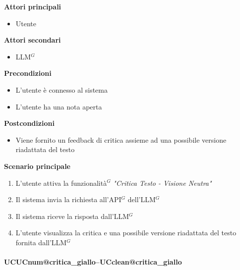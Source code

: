 \documentclass[a4paper,10pt]{article}
\makeatletter
\def\UCText#1{UC\csname UCnum@#1\endcsname\space--\space\csname UCclean@#1\endcsname}%
\makeatother
\begin{document}
    \textbf{Attori principali}
    \begin{itemize}
        \item Utente
    \end{itemize}
    \textbf{Attori secondari}
    \begin{itemize}
        \item LLM$^G$
    \end{itemize}
    \textbf{Precondizioni}
    \begin{itemize}
        \item L'utente è connesso al sistema
        \item L'utente ha una nota aperta
    \end{itemize}
    \textbf{Postcondizioni}
    \begin{itemize}
        \item Viene fornito un feedback di critica assieme ad una possibile versione riadattata del testo
    \end{itemize}
    \textbf{Scenario principale}
    \begin{enumerate}
        \item L'utente attiva la funzionalità$^G$ \textit{"Critica Testo - Visione Neutra"}
        \item Il sistema invia la richiesta all'API$^G$ dell'LLM$^G$
        \item Il sistema riceve la risposta dall'LLM$^G$
        \item L'utente visualizza la critica e una possibile versione riadattata del testo fornita dall'LLM$^G$
    \end{enumerate}

    \paragraph{\UCText{critica_giallo}}
\end{document}
